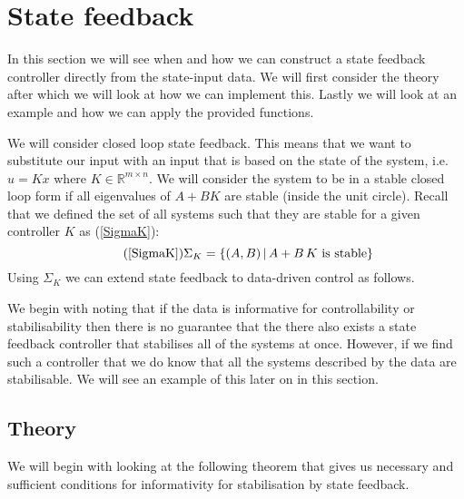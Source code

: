 \section{State feedback}
In this section we will see when and how we can construct a state feedback controller directly from the state-input data. We will first consider the theory after which we will look at how we can implement this. Lastly we will look at an example and how we can apply the provided functions.

We will consider closed loop state feedback. This means that we want to substitute our input with an input that is based on the state of the system, i.e. $u = K x$ where $K \in \mathbb{R}^{m\times n}$. We will consider the system to be in a stable closed loop form if all eigenvalues of $A + B K$ are stable (inside the unit circle). Recall that we defined the set of all systems such that they are stable for a given controller $K$ as (\ref{SigmaK}):
\begin{equation} \tag{\ref{SigmaK}}
	\Sigma_K = \{ (A,B) \, | \, A + B \, K \mbox{ is stable} \}
\end{equation}
Using $\Sigma_K$ we can extend state feedback to data-driven control as follows.


We begin with noting that if the data is informative for controllability or stabilisability then there is no guarantee that the there also exists a state feedback controller that stabilises all of the systems at once. However, if we find such a controller that we do know that all the systems described by the data are stabilisable. We will see an example of this later on in this section.

\subsection{Theory}
We will begin with looking at the following theorem that gives us necessary and sufficient conditions for informativity for stabilisation by state feedback.


